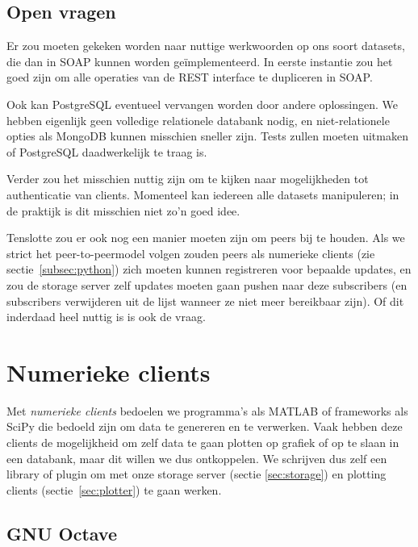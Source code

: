 \documentclass[a4paper]{article}
\begin{document}
\subsection{Open vragen}
\label{subsec:storagetodo}

Er zou moeten gekeken worden naar nuttige werkwoorden op ons soort datasets, die
dan in \gls{SOAP} kunnen worden ge\"implementeerd. In eerste instantie zou het
goed zijn om alle operaties van de \gls{REST} interface te dupliceren in
\gls{SOAP}.

Ook kan Postgre\gls{SQL} eventueel vervangen worden door andere oplossingen. We
hebben eigenlijk geen volledige relationele databank nodig, en niet-relationele
opties als MongoDB kunnen misschien sneller zijn. Tests zullen moeten uitmaken
of Postgre\gls{SQL} daadwerkelijk te traag is.

Verder zou het misschien nuttig zijn om te kijken naar mogelijkheden tot
authenticatie van clients. Momenteel kan iedereen alle datasets manipuleren;
in de praktijk is dit misschien niet zo'n goed idee.

Tenslotte zou er ook nog een manier moeten zijn om peers bij te houden. Als we
strict het peer-to-peermodel volgen zouden peers als numerieke clients (zie
sectie~\ref{subsec:python}) zich moeten kunnen registreren voor bepaalde
updates, en zou de storage server zelf updates moeten gaan pushen naar deze
subscribers (en subscribers verwijderen uit de lijst wanneer ze niet meer
bereikbaar zijn). Of dit inderdaad heel nuttig is is ook de vraag.

\newpage

\section{Numerieke clients}
\label{sec:numclient}

Met {\it numerieke clients} bedoelen we programma's als MATLAB of frameworks
als SciPy die bedoeld zijn om data te genereren en te verwerken. Vaak hebben
deze clients de mogelijkheid om zelf data te gaan plotten op grafiek of op te
slaan in een databank, maar dit willen we dus ontkoppelen. We schrijven dus
zelf een library of plugin om met onze storage server (sectie
\ref{sec:storage}) en plotting clients (sectie~\ref{sec:plotter}) te gaan
werken.

\subsection{\gls{GNU} Octave}
\end{document}
